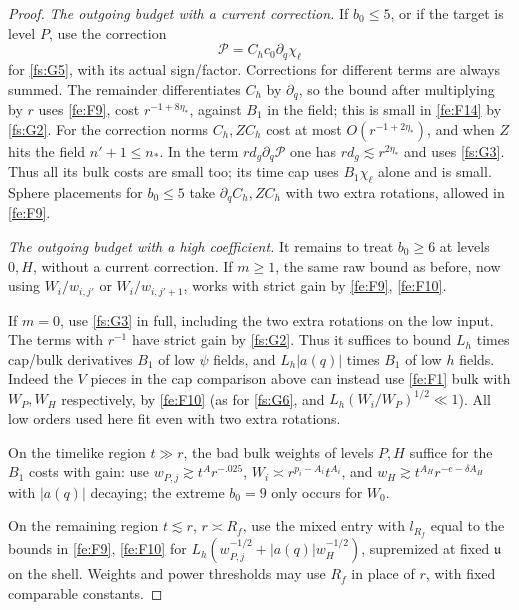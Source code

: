 \begin{proof}
\smallskip\noindent\emph{The outgoing budget with a current correction.}
If $b_0\le5$, or if the target is level $P$, use the correction
\[
                         \mathcal P=C_h c_0\partial_q\chi_\ell
\]
for \eqref{fs:G5}, with its actual sign/factor. Corrections for different terms are always summed. The remainder differentiates \(C_h\) by \(\partial_q\), so the bound after multiplying by \(r\) uses \eqref{fe:F9}, cost \(r^{-1+8\eta_*}\), against \(B_1\) in the field; this is small in \eqref{fe:F14} by \eqref{fs:G2}. For the correction norms \(C_h,ZC_h\) cost at most \(O(r^{-1+2\eta_*})\), and when \(Z\) hits the field \(n'+1\le n_*\). In the term \(r d_g\partial_q\mathcal P\) one has \(r d_g\lesssim r^{2\eta_*}\) and uses \eqref{fs:G3}. Thus all its bulk costs are small too; its time cap uses \(B_1\chi_\ell\) alone and is small. Sphere placements for \(b_0\le5\) take \(\partial_q C_h,Z C_h\) with two extra rotations, allowed in \eqref{fe:F9}.

\smallskip\noindent\emph{The outgoing budget with a high coefficient.}
It remains to treat $b_0\ge6$ at levels $0,H$, without a current
correction.  If $m\ge1$, the same raw bound as before, now using \(W_i/w_{i,j'}\) or \(W_i/w_{i,j'+1}\), works with strict gain by \eqref{fe:F9}, \eqref{fe:F10}. 

If \(m=0\), use \eqref{fs:G3} in full, including the two extra rotations on the low input. The terms with \(r^{-1}\) have strict gain by \eqref{fs:G2}. Thus it suffices to bound \(L_h\) times cap/bulk derivatives \(B_1\) of low \(\psi\) fields, and \(L_h |a(q)|\) times \(B_1\) of low \(h\) fields. Indeed the \(V\) pieces in the cap comparison above can instead use \eqref{fe:F1} bulk with \(W_P,W_H\) respectively, by \eqref{fe:F10} (as for \eqref{fs:G6}, and \(L_h(W_i/W_P)^{1/2}\ll 1\)). All low orders used here fit even with two extra rotations. 

On the timelike region \(t\gg r\), the bad bulk weights of levels \(P,H\) suffice for the \(B_1\) costs with gain: use \(w_{P,j}\gtrsim t^A r^{-.025}\), \(W_i\asymp r^{p_i-A_i}t^{A_i}\), and \(w_H\gtrsim t^{A_H}r^{-e-\delta A_H}\) with \(|a(q)|\) decaying; the extreme \(b_0=9\) only occurs for \(W_0\).

On the remaining region $t\lesssim r$, $r\asymp R_f$, use the mixed entry with
$l_{R_f}$ equal to the bounds in \eqref{fe:F9}, \eqref{fe:F10} for
$L_h(w_{P,j}^{-1/2}+|a(q)|w_H^{-1/2})$, supremized at fixed
$\mathfrak u$ on the shell.  Weights and power thresholds may use
$R_f$ in place of $r$, with fixed comparable constants.


\end{proof}
